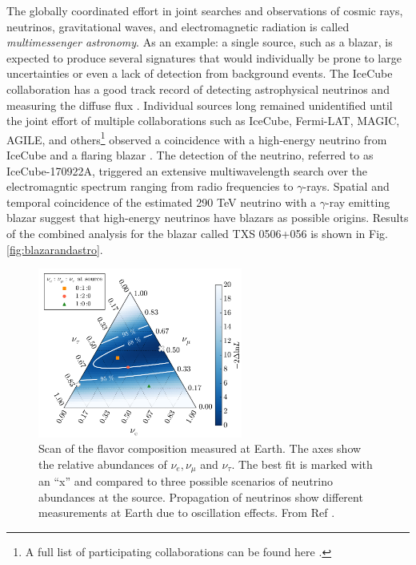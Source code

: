 The globally coordinated effort in joint searches and observations of cosmic rays, neutrinos, gravitational waves, and electromagnetic radiation is called \textit{multimessenger astronomy}. As an example: a single source, such as a blazar, is expected to produce several signatures that would individually be prone to large uncertainties or even a lack of detection from background events. The IceCube collaboration has a good track record of detecting astrophysical neutrinos and measuring the diffuse flux \cite{Klein:2018fnn,Aartsen:2017mau}. Individual sources long remained unidentified until the joint effort of multiple collaborations such as IceCube, Fermi-LAT, MAGIC, AGILE, and others\footnote{A full list of participating collaborations can be found here \cite{IceCube:2018dnn}.} observed a coincidence with a high-energy neutrino from IceCube and a flaring blazar \cite{IceCube:2018dnn}. The detection of the neutrino, referred to as IceCube-170922A, triggered an extensive multiwavelength search over the electromagntic spectrum ranging from radio frequencies to $\gamma$-rays. Spatial and temporal coincidence of the estimated 290 TeV neutrino with a $\gamma$-ray emitting blazar suggest that high-energy neutrinos have blazars as possible origins. Results of the combined analysis for the blazar called TXS 0506+056 is shown in Fig. \ref{fig:blazarandastro}. 

\begin{figure}[t]
\centering
\includegraphics[width=0.6\textwidth]{chapter5/img/FlavorTriangle.png}
\caption{Scan of the flavor composition measured at Earth. The axes show the relative abundances of $\nu_e, \nu_\mu$ and $\nu_\tau$. The best fit is marked with an ``x'' and compared to three possible scenarios of neutrino abundances at the source. Propagation of neutrinos show different measurements at Earth due to oscillation effects. From Ref \cite{Aartsen:2015knd}.}
\label{fig:triangle}
\end{figure}

